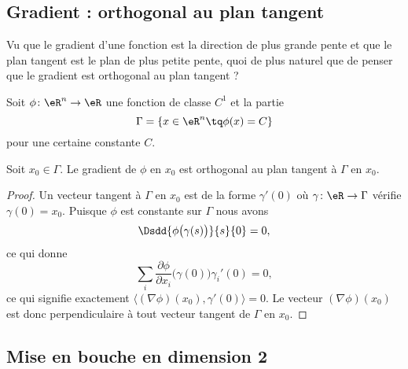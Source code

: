 \subsection{Gradient : orthogonal au plan tangent}

Vu que le gradient d'une fonction est la direction de plus grande pente et que le plan tangent est le plan de plus petite pente, quoi de plus naturel que de penser que le gradient est orthogonal au plan tangent ?

\begin{lemma}
	Soit \( \phi\colon \eR^n\to \eR\) une fonction de classe \( C^1\) et la partie
	\begin{equation}
		\Gamma=\{ x\in \eR^n\tq \phi(x)=C \}
	\end{equation}
	pour une certaine constante \( C\).

	Soit \( x_0\in \Gamma\). Le gradient de \( \phi\) en \( x_0\) est orthogonal au plan tangent à \( \Gamma\) en \( x_0\).
\end{lemma}

\begin{proof}
	Un vecteur tangent à \( \Gamma\) en \( x_0\) est de la forme \( \gamma'(0)\) où \( \gamma\colon \eR \to \Gamma\) vérifie \( \gamma(0)=x_0\). Puisque \( \phi\) est constante sur \( \Gamma\) nous avons
	\begin{equation}
		\Dsdd{ \phi\big( \gamma(s) \big) }{s}{0}=0,
	\end{equation}
	ce qui donne
	\begin{equation}
		\sum_i\frac{ \partial \phi }{ \partial x_i }\big( \gamma(0) \big)\gamma_i'(0)=0,
	\end{equation}
	ce qui signifie exactement \( \langle (\nabla\phi)(x_0), \gamma'(0)\rangle=0\). Le vecteur \( (\nabla\phi)(x_0)\) est donc perpendiculaire à tout vecteur tangent de \( \Gamma\) en \( x_0\).
\end{proof}

\subsection{Mise en bouche en dimension 2}

